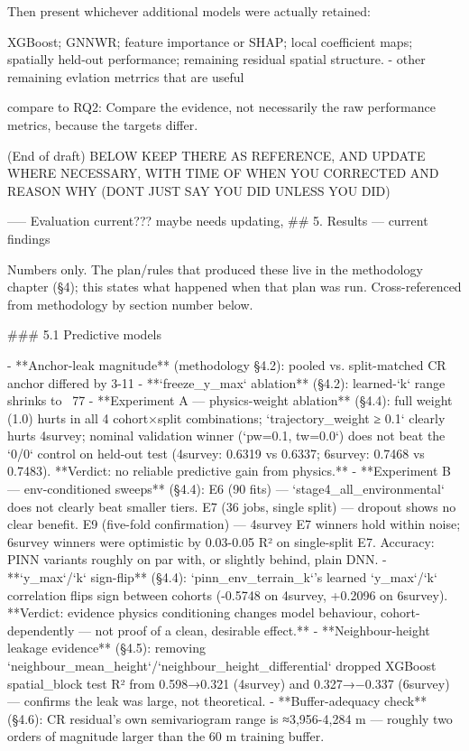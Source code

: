 Then present whichever additional models were actually retained:

XGBoost;
GNNWR;
feature importance or SHAP;
local coefficient maps;
spatially held-out performance;
remaining residual spatial structure.
- other remaining evlation metrrics that are useful 


compare to RQ2: Compare the evidence, not necessarily the raw performance metrics, because the targets differ.



(End of draft)
BELOW KEEP THERE AS REFERENCE, AND UPDATE WHERE NECESSARY, WITH TIME OF WHEN YOU CORRECTED AND REASON WHY (DONT JUST SAY YOU DID UNLESS YOU DID)

----- Evaluation current??? maybe needs updating, 
## 5. Results — current findings

Numbers only. The plan/rules that produced these live in the methodology chapter (§4); this states what
happened when that plan was run. Cross-referenced from methodology by section number below.

### 5.1 Predictive models

- **Anchor-leak magnitude** (methodology §4.2): pooled vs. split-matched CR anchor differed by 3-11%
- **`freeze_y_max` ablation** (§4.2): learned-`k` range shrinks to ~77%
- **Experiment A — physics-weight ablation** (§4.4): full weight (1.0) hurts in all 4 cohort×split combinations; `trajectory_weight ≥ 0.1` clearly hurts 4survey; nominal validation winner (`pw=0.1, tw=0.0`) does not beat the `0/0` control on held-out test (4survey: 0.6319 vs 0.6337; 6survey: 0.7468 vs 0.7483). **Verdict: no reliable predictive gain from physics.**
- **Experiment B — env-conditioned sweeps** (§4.4): E6 (90 fits) — `stage4_all_environmental` does not clearly beat smaller tiers. E7 (36 jobs, single split) — dropout shows no clear benefit. E9 (five-fold confirmation) — 4survey E7 winners hold within noise; 6survey winners were optimistic by 0.03-0.05 R² on single-split E7. Accuracy: PINN variants roughly on par with, or slightly behind, plain DNN.
- **`y_max`/`k` sign-flip** (§4.4): `pinn_env_terrain_k`'s learned `y_max`/`k` correlation flips sign between cohorts (-0.5748 on 4survey, +0.2096 on 6survey). **Verdict: evidence physics conditioning changes model behaviour, cohort-dependently — not proof of a clean, desirable effect.**
- **Neighbour-height leakage evidence** (§4.5): removing `neighbour_mean_height`/`neighbour_height_differential` dropped XGBoost spatial_block test R² from 0.598→0.321 (4survey) and 0.327→−0.337 (6survey) — confirms the leak was large, not theoretical.
- **Buffer-adequacy check** (§4.6): CR residual's own semivariogram range is ≈3,956-4,284 m — roughly two orders of magnitude larger than the 60 m training buffer.

